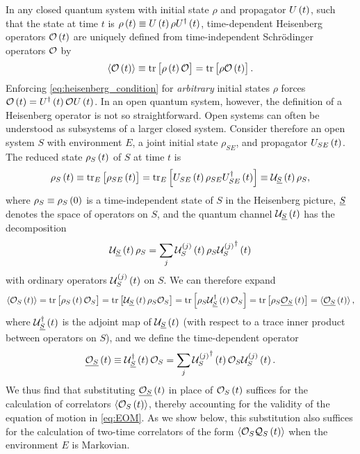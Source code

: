 In any closed quantum system with initial state $\rho$ and propagator
$U\left( t \right)$, such that the state at time $t$ is
$\rho\left( t \right)\equiv U\left( t \right)\rho U^\dag\left( t \right)$, time-dependent Heisenberg
operators $\mathcal{O}\left( t \right)$ are uniquely defined from time-independent
Schr\"odinger operators $\mathcal{O}$ by
\begin{align}
  \braket{\mathcal{O}\left( t \right)} \equiv \tr\left[ \rho\left( t \right)\mathcal{O} \right] = \tr\left[ \rho\mathcal{O}\left( t \right) \right].
  \label{eq:heisenberg_condition}
\end{align}
Enforcing \eqref{eq:heisenberg_condition} for {\it arbitrary} initial
states $\rho$ forces $\mathcal{O}\left( t \right)=U^\dag\left( t \right)\mathcal{O} U\left( t \right)$.  In an open
quantum system, however, the definition of a Heisenberg operator is
not so straightforward.  Open systems can often be understood as
subsystems of a larger closed system.  Consider therefore an open
system $S$ with environment $E$, a joint initial state $\rho_{SE}$,
and propagator $U_{SE}\left( t \right)$.  The reduced state $\rho_S\left( t \right)$ of $S$
at time $t$ is
\begin{align}
  \rho_S\left( t \right)
  \equiv \tr_E\left[ \rho_{SE}\left( t \right) \right]
  = \tr_E\left[ U_{SE}\left( t \right) \rho_{SE} U_{SE}^\dag\left( t \right) \right]
  \equiv \mathcal{U}_{\underline S}\left( t \right) \rho_S,
  \label{eq:state_S}
\end{align}
where $\rho_S\equiv\rho_S\left( 0 \right)$ is a time-independent state of $S$ in
the Heisenberg picture, $\underline S$ denotes the space of operators on $S$,
and the quantum channel $\mathcal{U}_{\underline S}\left( t \right)$ has the
decomposition\cite{rivas2012time}
\begin{align}
  \mathcal{U}_{\underline S}\left( t \right) \rho_S
  = \sum_j \mathcal{U}_S^{(j)}\left( t \right) \rho_S {\mathcal{U}_S^{(j)}}^\dag\left( t \right)
\end{align}
with ordinary operators $\mathcal{U}_S^{(j)}\left( t \right)$ on $S$.  We can therefore
expand
\begin{align}
  \braket{\mathcal{O}_S\left( t \right)}
  = \tr\left[ \rho_S\left( t \right)\mathcal{O}_S \right]
  = \tr\left[ \mathcal{U}_{\underline S}\left( t \right) \rho_S \mathcal{O}_S \right]
  = \tr\left[ \rho_S \mathcal{U}_{\underline S}^\dag\left( t \right) \mathcal{O}_S \right]
  = \tr\left[ \rho_S \underline{\mathcal{O}_S}\left( t \right) \right]
  = \braket{\underline{\mathcal{O}_S}\left( t \right)},
  \label{eq:heisenberg_correlator}
\end{align}
where $\mathcal{U}_{\underline S}^\dag\left( t \right)$ is the adjoint map of $\mathcal{U}_{\underline S}\left( t \right)$
(with respect to a trace inner product between operators on $S$), and
we define the time-dependent operator
\begin{align}
  \underline{\mathcal{O}_S}\left( t \right)
  \equiv \mathcal{U}_{\underline S}^\dag\left( t \right) \mathcal{O}_S
  = \sum_j {\mathcal{U}_S^{(j)}}^\dag\left( t \right) \mathcal{O}_S \mathcal{U}_S^{(j)}\left( t \right).
  \label{eq:heisenberg_wrong}
\end{align}
We thus find that substituting $\underline{\mathcal{O}_S}\left( t \right)$ in place of
$\mathcal{O}_S\left( t \right)$ suffices for the calculation of correlators
$\braket{\mathcal{O}_S\left( t \right)}$, thereby accounting for the validity of the equation
of motion in \eqref{eq:EOM}.  As we show below, this substitution also
suffices for the calculation of two-time correlators of the form
$\braket{\mathcal{O}_S\mathcal{Q}_S\left( t \right)}$ when the environment $E$ is Markovian.

